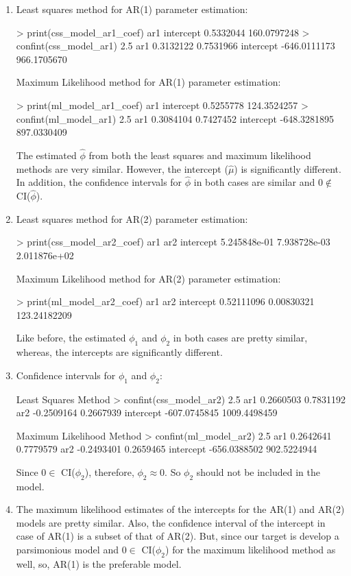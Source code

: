\begin{enumerate}[label=(\alph*)]
    \item Least squares method for AR(1) parameter estimation: \small\begin{block}
> print(css_model_ar1_coef)
        ar1   intercept 
  0.5332044 160.0797248 
> confint(css_model_ar1)
                 2.5 %
ar1          0.3132122   0.7531966
intercept -646.0111173 966.1705670
\end{block}
\normalsize Maximum Likelihood method for AR(1) parameter estimation: \small\begin{block}
> print(ml_model_ar1_coef)
        ar1   intercept 
  0.5255778 124.3524257 
> confint(ml_model_ar1)
                 2.5 %
ar1          0.3084104   0.7427452
intercept -648.3281895 897.0330409
\end{block}
\normalsize The estimated $\hat\phi$ from both the least squares and maximum likelihood methods are very similar. However, the intercept ($\hat\mu$) is significantly different. In addition, the confidence intervals for $\hat\phi$ in both cases are similar and $0 \not\in$ CI($\hat\phi$). 
    \item Least squares method for AR(2) parameter estimation: \small\begin{block}
> print(css_model_ar2_coef)
         ar1          ar2    intercept 
5.245848e-01 7.938728e-03 2.011876e+02 
\end{block}
\normalsize Maximum Likelihood method for AR(2) parameter estimation: \small\begin{block}
> print(ml_model_ar2_coef)
         ar1          ar2    intercept 
  0.52111096   0.00830321 123.24182209 
\end{block}
\normalsize Like before, the estimated $\phi_1$ and $\phi_2$ in both cases are pretty similar, whereas, the intercepts are significantly different. 
\item Confidence intervals for $\phi_1$ and $\phi_2$: \small\begin{block}
Least Squares Method
> confint(css_model_ar2)
                 2.5 %
ar1          0.2660503    0.7831192
ar2         -0.2509164    0.2667939
intercept -607.0745845 1009.4498459

Maximum Likelihood Method
> confint(ml_model_ar2)
                 2.5 %
ar1          0.2642641   0.7779579
ar2         -0.2493401   0.2659465
intercept -656.0388502 902.5224944
\end{block}
\normalsize Since $0 \in$ CI($\phi_2$), therefore, $\phi_2 \approx 0$. So $\phi_2$ should not be included in the model.
\item \label{answer_ref_d} The maximum likelihood estimates of the intercepts for the AR(1) and AR(2) models are pretty similar. Also, the confidence interval of the intercept in case of AR(1) is a subset of that of AR(2). But, since our target is develop a parsimonious model and $0 \in$ CI($\phi_2$) for the maximum likelihood method as well, so, AR(1) is the preferable model. 


\end{enumerate}
